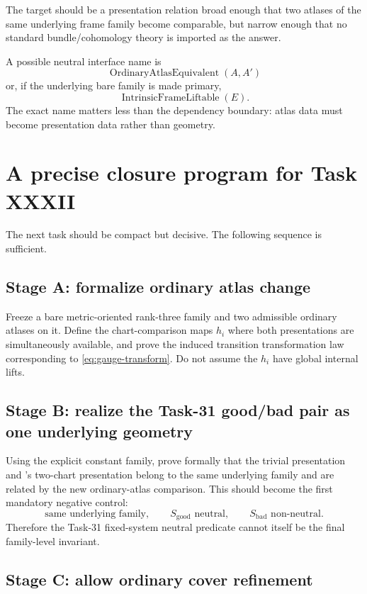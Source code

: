 \documentclass[11pt,a4paper]{article}
\theoremstyle{definition}
\newcommand{\code}[1]{\path{#1}}
\begin{document}
The target should be a presentation relation broad enough that two atlases of the same underlying frame family become comparable, but narrow enough that no standard bundle/cohomology theory is imported as the answer.

A possible neutral interface name is
\[
 \operatorname{OrdinaryAtlasEquivalent}(A,A')
\]
or, if the underlying bare family is made primary,
\[
 \operatorname{IntrinsicFrameLiftable}(E).
\]
The exact name matters less than the dependency boundary: atlas data must become presentation data rather than geometry.

\section{A precise closure program for Task XXXII}\label{sec:xxxii-program}

The next task should be compact but decisive.  The following sequence is sufficient.

\subsection{Stage A: formalize ordinary atlas change}

Freeze a bare metric-oriented rank-three family and two admissible ordinary atlases on it.  Define the chart-comparison maps $h_i$ where both presentations are simultaneously available, and prove the induced transition transformation law corresponding to \cref{eq:gauge-transform}.  Do not assume the $h_i$ have global internal lifts.

\subsection{Stage B: realize the Task-31 good/bad pair as one underlying geometry}

Using the explicit constant family, prove formally that the trivial presentation and \code{badFamily}'s two-chart presentation belong to the same underlying family and are related by the new ordinary-atlas comparison.  This should become the first mandatory negative control:
\begin{equation}\label{eq:bad-repair}
 \text{same underlying family},\qquad
 S_{\mathrm{good}}\text{ neutral},\qquad
 S_{\mathrm{bad}}\text{ non-neutral}.
\end{equation}
Therefore the Task-31 fixed-system neutral predicate cannot itself be the final family-level invariant.

\subsection{Stage C: allow ordinary cover refinement}
\end{document}

